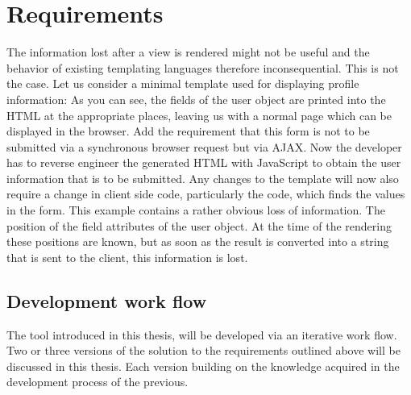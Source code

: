 \chapter{Requirements}
The information lost after a view is rendered might not be useful and
the behavior of existing templating languages therefore inconsequential.
This is not the case. Let us consider a minimal template used for
displaying profile information:
\todo{\dots}
As you can see, the fields of the user object are printed into the HTML
at the appropriate places, leaving us with a normal page which can be
displayed in the browser.
Add the requirement that this form is not to be submitted via a
synchronous browser request but via AJAX. Now the developer has to
reverse engineer the generated HTML with JavaScript to obtain the
user information that is to be submitted. Any changes to the template
will now also require a change in client side code, particularly the
code, which finds the values in the form.
This example contains a rather obvious loss of information.
The position of the field attributes of the user object.
At the time of the rendering these positions are known, but as soon as the
result is converted into a string that is sent to the client, this
information is lost.


\section{Development work flow}
The tool introduced in this thesis, will be developed via an iterative
work flow. Two or three versions of the solution to the requirements outlined
above will be discussed in this thesis. Each version building on the knowledge
acquired in the development process of the previous.
